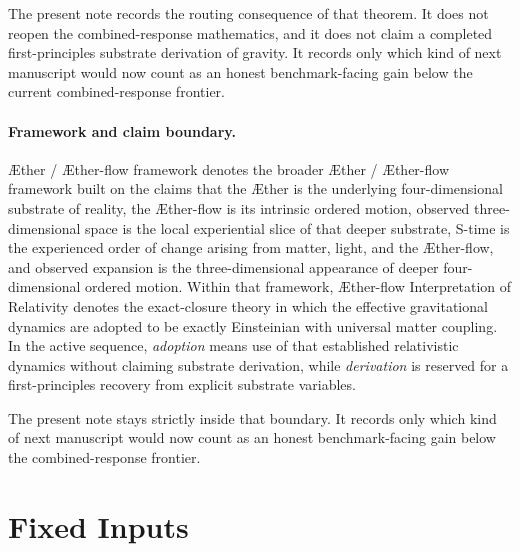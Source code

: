 \documentclass[11pt]{article}
\newcommand{\Aether}{\AE{}ther}
\newcommand{\Aflow}{\AE{}ther-flow}
\newcommand{\TheoryName}{\Aflow{} Interpretation of Relativity}
\newcommand{\TheoryProgram}{\Aether{} / \Aflow{} framework}
\begin{document}
The present note records the routing consequence of that theorem. It does not reopen the combined-response mathematics, and it does not claim a completed first-principles substrate derivation of gravity. It records only which kind of next manuscript would now count as an honest benchmark-facing gain below the current combined-response frontier.

\paragraph{Framework and claim boundary.}
\TheoryProgram{} denotes the broader \Aether{} / \Aflow{} framework built on the claims that the \Aether{} is the underlying four-dimensional substrate of reality, the \Aflow{} is its intrinsic ordered motion, observed three-dimensional space is the local experiential slice of that deeper substrate, S-time is the experienced order of change arising from matter, light, and the \Aflow{}, and observed expansion is the three-dimensional appearance of deeper four-dimensional ordered motion. Within that framework, \TheoryName{} denotes the exact-closure theory in which the effective gravitational dynamics are adopted to be exactly Einsteinian with universal matter coupling. In the active sequence, \emph{adoption} means use of that established relativistic dynamics without claiming substrate derivation, while \emph{derivation} is reserved for a first-principles recovery from explicit substrate variables.

The present note stays strictly inside that boundary. It records only which kind of next manuscript would now count as an honest benchmark-facing gain below the combined-response frontier.

\section{Fixed Inputs}
\end{document}
